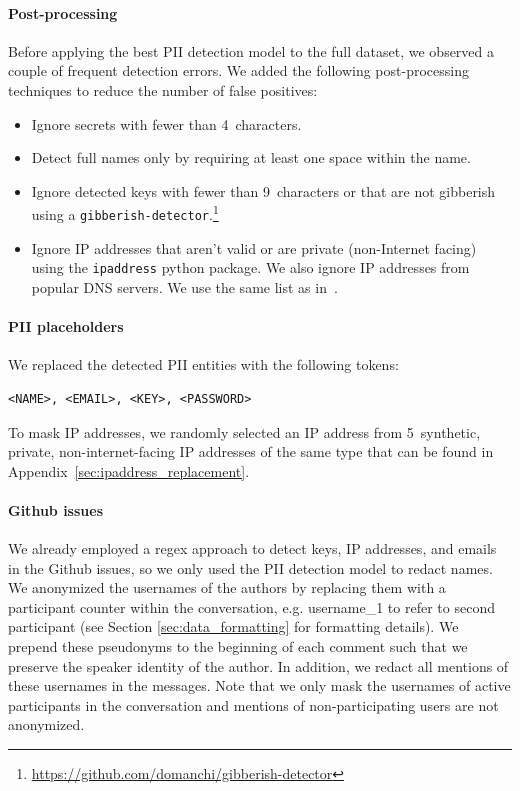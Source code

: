 \documentclass[10pt]{article} %
\begin{document}
\paragraph{Post-processing} Before applying the best PII detection model to the full dataset, we observed a couple of frequent detection errors. We added the following post-processing techniques to reduce the number of false positives:
\begin{itemize}
    \item Ignore secrets with fewer than 4~characters.
    \item Detect full names only by requiring at least one space within the name.
    \item Ignore detected keys with fewer than 9~characters or that are not gibberish using a \texttt{gibberish-detector}.\footnote{\url{https://github.com/domanchi/gibberish-detector}}
    \item Ignore IP addresses that aren't valid or are private (non-Internet facing) using the \texttt{ipaddress} python package. We also ignore IP addresses from popular DNS servers. We use the same list as in~\cite{allal2023santacoder}.
\end{itemize}




\paragraph{PII placeholders} We replaced the detected PII entities with the following tokens: 
\begin{verbatim}
<NAME>, <EMAIL>, <KEY>, <PASSWORD>
\end{verbatim}
To mask IP addresses, we randomly selected an IP address from 5~synthetic, private, non-internet-facing IP addresses of the same type that can be found in Appendix~\ref{sec:ipaddress_replacement}.

\paragraph{Github issues} We already employed a regex approach to detect keys, IP addresses, and emails in the Github issues, so we only used the PII detection model to redact names. We anonymized the usernames of the authors by replacing them with a participant counter within the conversation,  e.g. username\_1 to refer to second participant (see Section \ref{sec:data_formatting} for formatting details). We prepend these pseudonyms to the beginning of each comment such that we preserve the speaker identity of the author. In addition, we redact all mentions of these usernames in the messages. Note that we only mask the usernames of active participants in the conversation and mentions of non-participating users are not anonymized. 
\end{document}
